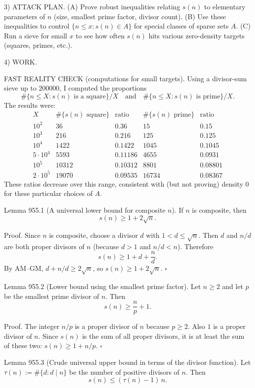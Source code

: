 3) ATTACK PLAN.
(A) Prove robust inequalities relating $s(n)$ to elementary parameters of $n$ (size, smallest prime factor, divisor count).
(B) Use these inequalities to control $\{n\le x: s(n)\in A\}$ for special classes of sparse sets $A$.
(C) Run a sieve for small $x$ to see how often $s(n)$ hits various zero-density targets (squares, primes, etc.).

4) WORK.

FAST REALITY CHECK (computations for small targets).
Using a divisor-sum sieve up to $200000$, I computed the proportions
\[\#\{n\le X: s(n)\text{ is a square}\}/X\quad\text{and}\quad \#\{n\le X: s(n)\text{ is prime}\}/X.\]
The results were:
\[
\begin{array}{c|c|c||c|c}
X & \#\{s(n)\text{ square}\} & \text{ratio} & \#\{s(n)\text{ prime}\} & \text{ratio}\\\hline
10^2 & 36 & 0.36 & 15 & 0.15\\
10^3 & 216 & 0.216 & 125 & 0.125\\
10^4 & 1422 & 0.1422 & 1045 & 0.1045\\
5\cdot 10^4 & 5593 & 0.11186 & 4655 & 0.0931\\
10^5 & 10312 & 0.10312 & 8801 & 0.08801\\
2\cdot 10^5 & 19070 & 0.09535 & 16734 & 0.08367
\end{array}
\]
These ratios decrease over this range, consistent with (but not proving) density $0$ for these particular choices of $A$.

Lemma 955.1 (A universal lower bound for composite $n$).
If $n$ is composite, then
\[
 s(n)\ge 1+2\sqrt{n}.
\]

Proof.
Since $n$ is composite, choose a divisor $d$ with $1<d\le \sqrt{n}$.
Then $d$ and $n/d$ are both proper divisors of $n$ (because $d>1$ and $n/d<n$).
Therefore
\[
 s(n)\ge 1 + d + \frac{n}{d}.
\]
By AM--GM, $d + n/d \ge 2\sqrt{n}$, so $s(n)\ge 1+2\sqrt{n}$.
\hfill $\square$

Lemma 955.2 (Lower bound using the smallest prime factor).
Let $n\ge 2$ and let $p$ be the smallest prime divisor of $n$.
Then
\[
 s(n)\ge \frac{n}{p}+1.
\]

Proof.
The integer $n/p$ is a proper divisor of $n$ because $p\ge 2$.
Also $1$ is a proper divisor of $n$.
Since $s(n)$ is the sum of all proper divisors, it is at least the sum of these two:
$s(n)\ge 1+n/p$.
\hfill $\square$

Lemma 955.3 (Crude universal upper bound in terms of the divisor function).
Let $\tau(n):=\#\{d:d\mid n\}$ be the number of positive divisors of $n$.
Then
\[
 s(n)\le (\tau(n)-1)\,n.
\]

